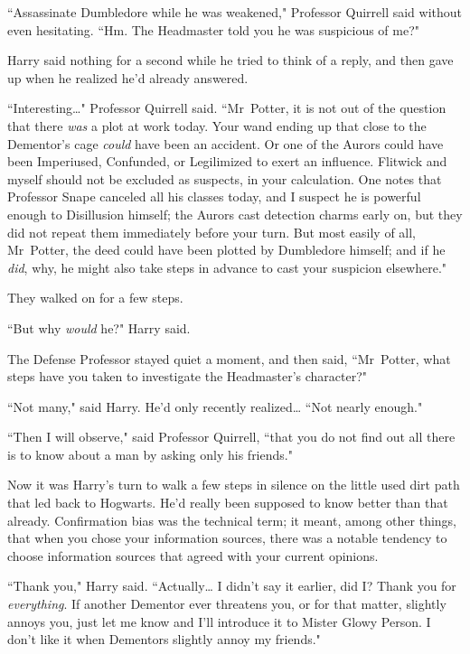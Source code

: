 ``Assassinate Dumbledore while he was weakened," Professor Quirrell said without even hesitating. ``Hm. The Headmaster told you he was suspicious of me?"

Harry said nothing for a second while he tried to think of a reply, and then gave up when he realized he'd already answered.

``Interesting{\ldots}" Professor Quirrell said. ``Mr~Potter, it is not out of the question that there \emph{was} a plot at work today. Your wand ending up that close to the Dementor's cage \emph{could} have been an accident. Or one of the Aurors could have been Imperiused, Confunded, or Legilimized to exert an influence. Flitwick and myself should not be excluded as suspects, in your calculation. One notes that Professor Snape canceled all his classes today, and I suspect he is powerful enough to Disillusion himself; the Aurors cast detection charms early on, but they did not repeat them immediately before your turn. But most easily of all, Mr~Potter, the deed could have been plotted by Dumbledore himself; and if he \emph{did}, why, he might also take steps in advance to cast your suspicion elsewhere."

They walked on for a few steps.

``But why \emph{would} he?" Harry said.

The Defense Professor stayed quiet a moment, and then said, ``Mr~Potter, what steps have you taken to investigate the Headmaster's character?"

``Not many," said Harry. He'd only recently realized{\ldots} ``Not nearly enough."

``Then I will observe," said Professor Quirrell, ``that you do not find out all there is to know about a man by asking only his friends."

Now it was Harry's turn to walk a few steps in silence on the little used dirt path that led back to Hogwarts. He'd really been supposed to know better than that already. Confirmation bias was the technical term; it meant, among other things, that when you chose your information sources, there was a notable tendency to choose information sources that agreed with your current opinions.

``Thank you," Harry said. ``Actually{\ldots} I didn't say it earlier, did I? Thank you for \emph{everything}. If another Dementor ever threatens you, or for that matter, slightly annoys you, just let me know and I'll introduce it to Mister Glowy Person. I don't like it when Dementors slightly annoy my friends."

